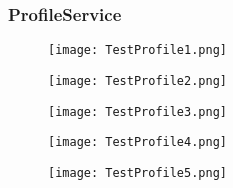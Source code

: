 \subsubsection{ProfileService}
\begin{figure}[h!]
    \begin{center}
        \texttt{[image: TestProfile1.png]}
    \end{center}
\end{figure}
\begin{figure}[h!]
    \begin{center}
        \texttt{[image: TestProfile2.png]}
    \end{center}
\end{figure}
\begin{figure}[h!]
    \begin{center}
        \texttt{[image: TestProfile3.png]}
    \end{center}
\end{figure}
\begin{figure}[h!]
    \begin{center}
        \texttt{[image: TestProfile4.png]}
    \end{center}
\end{figure}
\begin{figure}[h!]
    \begin{center}
        \texttt{[image: TestProfile5.png]}
    \end{center}
\end{figure}
\clearpage



